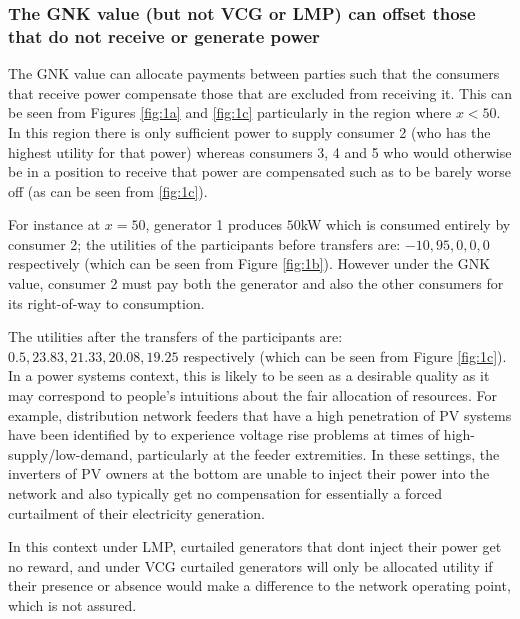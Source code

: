 
\subsubsection*{The GNK value (but not VCG or LMP) can offset those that do not receive or generate power}
The GNK value can allocate payments between parties such that the consumers that receive power compensate those that are excluded from receiving it.
This can be seen from Figures \ref{fig:1a} and \ref{fig:1c} particularly in the region where $x<50$.
In this region there is only sufficient power to supply consumer 2 (who has the highest utility for that power) whereas consumers 3, 4 and 5 who would otherwise be in a position to receive that power are
compensated such as to be barely worse off (as can be seen from \ref{fig:1c}).

For instance at $x=50$, generator 1 produces $50$kW which is consumed entirely by consumer 2; the utilities of the participants before transfers are: $-10, 95, 0, 0, 0$ respectively (which can be seen from Figure \ref{fig:1b}).
However under the GNK value, consumer 2 must pay both the generator and also the other consumers for its right-of-way to consumption.

The utilities after the transfers of the participants are: $0.5, 23.83, 21.33, 20.08, 19.25$ respectively (which can be seen from Figure \ref{fig:1c}).
In a power systems context, this is likely to be seen as a desirable quality as it may correspond to people's intuitions about the fair allocation of resources.
For example, distribution network feeders that have a high penetration of PV systems have been identified by \cite{feeder1} to experience voltage rise problems at 
times of high-supply/low-demand, particularly at the feeder extremities. 
In these settings, the inverters of PV owners at the bottom are unable to inject their power into the network and also typically get no compensation for essentially a forced curtailment of their electricity generation.

In this context under LMP, curtailed generators that dont inject their power get no reward, and under VCG curtailed generators will only be allocated utility if their presence or absence would make a difference to the network operating point, which is not assured.

